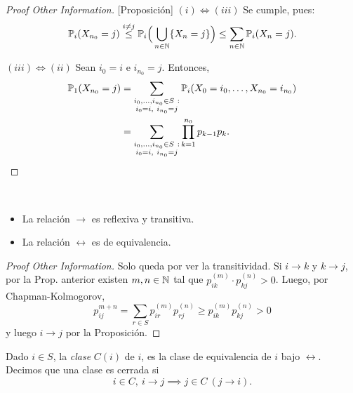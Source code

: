 
\begin{proof}[Proof Other Information][Proposición]
	$(i) \iff (iii)$ Se cumple, pues:
	\[ \mathbb{P}_{i}(X_{n_{0}} = j) \stackrel{i \neq j}{\leq} \mathbb{P}_{i} \Big( \bigcup_{n \in \mathbb{N}} \{X_{n} = j\} \Big) \leq \sum_{n \in \mathbb{N}} \mathbb{P}_{i}(X_{n} = j). \] 
	\par $(iii) \iff (ii)$ Sean $i_{0} = i$ e $i_{n_{0}} = j$. Entonces,
	\begin{align*}
		\mathbb{P}_{1}(X_{n_{0}} = j) &= \sum_{\substack{i_{0},\dots,i_{n_{0}} \in S \ : \\ i_{0} = i,\ i_{n_{0}} = j}} \mathbb{P}_{i}(X_{0} = i_{0},\dots,X_{n_{0}} = i_{n_{0}}) \\
		&= \sum_{\substack{i_{0},\dots,i_{n_{0}} \in S \ : \\ i_{0} = i,\ i_{n_{0}} = j}} \prod_{k=1}^{n_{0}} p_{k-1} p_{k}
	.\qedhere\end{align*}
\end{proof}

\begin{prop}~
	\begin{itemize}
		\item La relación $\to$ es reflexiva y transitiva.

		\item La relación $\leftrightarrow$ es de equivalencia.
	\end{itemize}
\end{prop}
\begin{proof}[Proof Other Information]
	Solo queda por ver la transitividad. Si $i \to k$ y $k \to j$, por la Prop. anterior existen $m,n \in \mathbb{N}$ tal que $p_{ik}^{(m)} \cdot p_{kj}^{(n)} > 0$. Luego, por Chapman-Kolmogorov,
	\[ p_{ij}^{m+n} = \sum_{r \in S} p_{ir}^{(m)} p_{rj}^{(n)} \geq p_{ik}^{(m)} p_{kj}^{(n)} > 0 \]
	y luego $i \to j$ por la Proposición.
\end{proof}

\begin{definition}
	Dado $i \in S$, la \textit{clase} $C(i)$ de $i$, es la clase de equivalencia de $i$ bajo $\leftrightarrow$. Decimos que una clase es cerrada si
	\[ i \in C,\ i \to j \implies j \in C \ (j \to i). \]
\end{definition}

